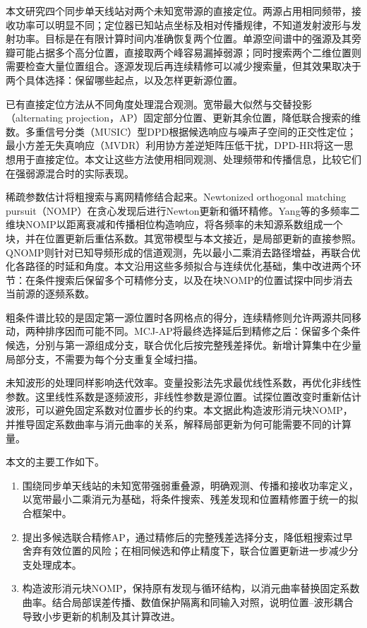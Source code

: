 \documentclass[a4paper,fleqn]{cas-sc}
\numberwithin{equation}{section}
\numberwithin{figure}{section}
\numberwithin{table}{section}
\begin{document}
本文研究四个同步单天线站对两个未知宽带源的直接定位。两源占用相同频带，接收功率可以明显不同；定位器已知站点坐标及相对传播规律，不知道发射波形与发射功率。目标是在有限计算时间内准确恢复两个位置。单源空间谱中的强源及其旁瓣可能占据多个高分位置，直接取两个峰容易漏掉弱源；同时搜索两个二维位置则需要检查大量位置组合。逐源发现后再连续精修可以减少搜索量，但其效果取决于两个具体选择：保留哪些起点，以及怎样更新源位置。

已有直接定位方法从不同角度处理混合观测。宽带最大似然与交替投影（alternating projection，AP）固定部分位置、更新其余位置，降低联合搜索的维数\cite{ChenHudsonYao2002}。多重信号分类（MUSIC）型DPD根据候选响应与噪声子空间的正交性定位\cite{WeissAmar2005}；最小方差无失真响应（MVDR）利用协方差逆矩阵压低干扰\cite{Capon1969}，DPD-HR将这一思想用于直接定位\cite{TirerWeiss2016}。本文让这些方法使用相同观测、处理频带和传播信息，比较它们在强弱源混合时的实际表现。

稀疏参数估计将粗搜索与离网精修结合起来。Newtonized orthogonal matching pursuit（NOMP）在贪心发现后进行Newton更新和循环精修\cite{Mamandipoor2016}。Yang等的多频率二维块NOMP以距离衰减和传播相位构造响应，将各频率的未知源系数组成一个块，并在位置更新后重估系数\cite{Yang2022}。其宽带模型与本文接近，是局部更新的直接参照。QNOMP则针对已知导频形成的信道观测，先以最小二乘消去路径增益，再联合优化各路径的时延和角度\cite{Zeng2025}。本文沿用这些多频拟合与连续优化基础，集中改进两个环节：在条件搜索后保留多个可精修分支，以及在块NOMP的位置试探中同步消去当前源的逐频系数。

粗条件谱比较的是固定第一源位置时各网格点的得分，连续精修则允许两源共同移动，两种排序因而可能不同。MCJ-AP将最终选择延后到精修之后：保留多个条件候选，分别与第一源组成分支，联合优化后按完整残差择优。新增计算集中在少量局部分支，不需要为每个分支重复全域扫描。

未知波形的处理同样影响迭代效率。变量投影法先求最优线性系数，再优化非线性参数\cite{GolubPereyra1973}。这里线性系数是逐频波形，非线性参数是源位置。试探位置改变时重新估计波形，可以避免固定系数对位置步长的约束。本文据此构造波形消元块NOMP，并推导固定系数曲率与消元曲率的关系，解释局部更新为何可能需要不同的计算量。

本文的主要工作如下。
\begin{enumerate}
  \item 围绕同步单天线站的未知宽带强弱重叠源，明确观测、传播和接收功率定义，以宽带最小二乘消元为基础，将条件搜索、残差发现和位置精修置于统一的拟合框架中。
  \item 提出多候选联合精修AP，通过精修后的完整残差选择分支，降低粗搜索过早舍弃有效位置的风险；在相同候选和停止精度下，联合位置更新进一步减少分支处理成本。
  \item 构造波形消元块NOMP，保持原有发现与循环结构，以消元曲率替换固定系数曲率。结合局部误差传播、数值保护隔离和同输入对照，说明位置--波形耦合导致小步更新的机制及其计算改进。
\end{enumerate}
\end{document}
